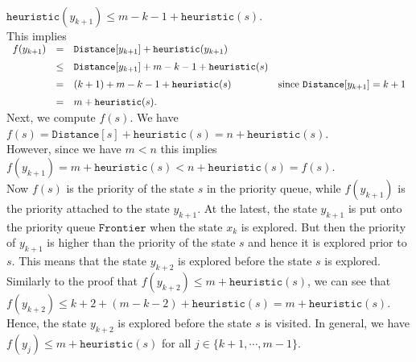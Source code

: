 \\[0.2cm]
\hspace*{1.3cm}
$\texttt{heuristic}(y_{k+1}) \leq m - k - 1 + \texttt{heuristic}(s)$.
\\[0.2cm]
This implies
\\[0.2cm]
\hspace*{1.3cm}
$
\begin{array}[t]{lcll} 
f(y_{k+1}) & =  & \texttt{Distance}[y_{k+1}] + \texttt{heuristic}(y_{k+1})     \\[0.2cm]
          &\leq& \texttt{Distance}[y_{k+1}] + m-k-1 + \texttt{heuristic}(s) \\[0.2cm]
          & =  & (k+1) + m-k-1 + \texttt{heuristic}(s) 
               & \mbox{since $\texttt{Distance}[y_{k+1}] = k+1$} \\[0.2cm]
          & =  & m + \texttt{heuristic}(s). 
\end{array}
$
\\[0.2cm]
Next, we compute $f(s)$.  We have
\\[0.2cm]
\hspace*{1.3cm}
$f(s) = \texttt{Distance}[s] + \texttt{heuristic}(s) = n + \texttt{heuristic}(s)$.
\\[0.2cm]
However, since we have $m < n$ this implies
\\[0.2cm]
\hspace*{1.3cm}
$f(y_{k+1}) = m + \texttt{heuristic}(s) < n + \mathtt{heuristic}(s) = f(s)$.
\\[0.2cm]
Now $f(s)$ is the priority of the state $s$ in the priority queue, while $f(y_{k+1})$ is the priority
attached to the state $y_{k+1}$.  At the latest,  the state $y_{k+1}$ is put onto the priority queue $\texttt{Frontier}$
when the state $x_k$ is explored.  But then the priority of $y_{k+1}$ is higher than the priority
of the state $s$ and hence it is explored prior to $s$.  This means that the state $y_{k+2}$ is explored before
the state $s$ is explored.  Similarly to the proof that 
$f(y_{k+2}) \leq m + \texttt{heuristic}(s)$, 
we can see that 
\\[0.2cm]
\hspace*{1.3cm}
$f(y_{k+2}) \leq k+2 + (m-k-2) + \texttt{heuristic}(s) = m + \texttt{heuristic}(s)$.
\\[0.2cm]
Hence, the state $y_{k+2}$ is explored before the state $s$ is visited.  In general, we have
\\[0.2cm]
\hspace*{1.3cm}
$f(y_{j}) \leq m + \texttt{heuristic}(s)$ \quad for all $j \in \{k+1,\cdots,m-1\}$.
